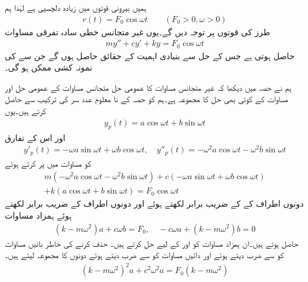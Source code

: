 ہمیں  بیرونی قوتوں میں زیادہ دلچسپی ہے لہٰذا ہم
\begin{align*}
r(t)=F_0\cos \omega t\quad\quad (F_0 >0, \omega>0)
\end{align*}
طرز کی قوتوں پر توجہ دیں گے۔یوں غیر متجانس خطی سادہ تفرقی مساوات 
 \begin{align}\label{مساوات_سادہ_دو_غیر_متجانس_نظام_پ}
my''+cy'+ky=F_0 \cos \omega t
\end{align} 
حاصل ہوتی ہے جس کے حل سے بنیادی اہمیت کے حقائق حاصل ہوں گے  جن سے  کی نمونہ کشی ممکن ہو گی۔

ہم نے حصہ  میں دیکھا کہ غیر متجانس مساوات  کا عمومی حل  متجانس مساوات  کے عمومی حل  اور مساوات  کے کوئی بھی حل  کا مجموعہ ہے۔ہم  کو حصہ  کے نا معلوم عدد سر کی ترکیب سے حاصل کرتے ہیں۔یوں
\begin{align}\label{مساوات_سادہ_دو_جبری_تفاعل_حل}
y_p(t)=a \cos \omega t +b \sin \omega t
\end{align}
اور اس کے تفارق
\begin{align*}
y'_p(t)=-\omega a \sin \omega t+\omega b \cos \omega t, \quad y''_p(t)=-\omega^2a\cos \omega t-\omega^2 b\sin \omega t
\end{align*}
کو مساوات  میں پر کرتے ہوئے
 \begin{multline*}
m(-\omega^2a\cos \omega t-\omega^2 b\sin \omega t)+c(-\omega a \sin \omega t+\omega b \cos \omega t)\\
+k(a \cos \omega t+b \sin \omega t)=F_0 \cos \omega t
\end{multline*} 
 دونوں اطراف کے  کے  ضریب  برابر لکھتے ہوئے اور دونوں اطراف  کے  ضریب  برابر لکھتے ہوئے ہمزاد مساوات
\begin{align*}
(k-m\omega^2)a+c\omega b=F_0,\quad -c\omega a+(k-m\omega^2)b=0 
\end{align*}
حاصل ہوتے ہیں۔ان ہمزاد مساوات کو  اور  کے لیے حل کرتے ہیں۔ حذف کرنے کی خاطر بائیں مساوات کو  سے ضرب دیتے ہوئے اور دائیں مساوات کو  سے ضرب دیتے ہوئے دونوں کا مجموعہ لیتے ہیں۔
\begin{align*}
(k-m\omega^2)^2a+c^2\omega^2a=F_0(k-m\omega^2)
\end{align*}
